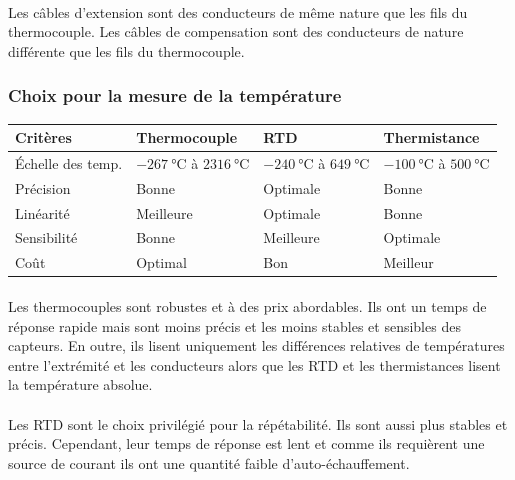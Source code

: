\documentclass{article}
\begin{document}
\paragraph{}
Les câbles d'extension sont des conducteurs de même nature que les fils du thermocouple. Les câbles de compensation sont des conducteurs de nature différente que les fils du thermocouple.

\subsubsection{Choix pour la mesure de la température}
\begin{table}[H]
    \centering
    \begin{tabular}{l | l | l | l}
        \textbf{Critères} & \textbf{Thermocouple} & \textbf{RTD} & \textbf{Thermistance}\\
        \hline
        Échelle des temp. & $\SI{-267}{\celsius}$ à $\SI{2316}{\celsius}$ & $\SI{-240}{\celsius}$ à $\SI{649}{\celsius}$ & $\SI{-100}{\celsius}$ à $\SI{500}{\celsius}$\\
        \hline
        Précision & Bonne & Optimale & Bonne\\
        \hline
        Linéarité & Meilleure & Optimale & Bonne\\
        \hline
        Sensibilité & Bonne & Meilleure & Optimale \\
        \hline
        Coût & Optimal & Bon & Meilleur\\
    \end{tabular}
\end{table}

\paragraph{}
Les thermocouples sont robustes et à des prix abordables. Ils ont un temps de réponse rapide mais sont moins précis et les moins stables et sensibles des capteurs. En outre, ils lisent uniquement les différences relatives de températures entre l'extrémité et les conducteurs alors que les RTD et les thermistances lisent la température absolue.

\paragraph{}
Les RTD sont le choix privilégié pour la répétabilité. Ils sont aussi plus stables et précis. Cependant, leur temps de réponse est lent et comme ils requièrent une source de courant ils ont une quantité faible d'auto-échauffement.
\end{document}
